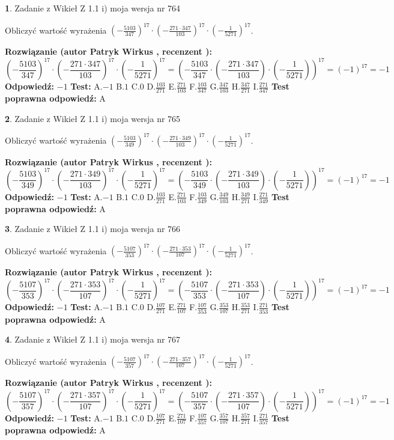 \documentclass[12pt, a4paper]{article}
\theoremstyle{definition} %
\newtheorem{zad}{}
\newcommand{\zadStart}[1]{\begin{zad}#1\newline}
\newcommand{\zadStop}{\end{zad}}
\newcommand{\rozwStart}[2]{\noindent \textbf{Rozwiązanie (autor #1 , recenzent #2): }\newline}
\newcommand{\rozwStop}{\newline}
\newcommand{\odpStart}{\noindent \textbf{Odpowiedź:}\newline}
\newcommand{\odpStop}{\newline}
\newcommand{\testStart}{\noindent \textbf{Test:}\newline}
\newcommand{\testStop}{\newline}
\newcommand{\kluczStart}{\noindent \textbf{Test poprawna odpowiedź:}\newline}
\newcommand{\kluczStop}{\newline}
\begin{document}
\zadStart{Zadanie z Wikieł Z 1.1 i) moja wersja nr 764}

Obliczyć wartość wyrażenia $(-\frac{5103}{347})^{17} \cdot (-\frac{271 \cdot 347}{103})^{17} \cdot (-\frac{1}{5271})^{17}$.
\zadStop
\rozwStart{Patryk Wirkus}{}
$$(-\frac{5103}{347})^{17} \cdot (-\frac{271 \cdot 347}{103})^{17} \cdot (-\frac{1}{5271})^{17} = (-\frac{5103}{347} \cdot (-\frac{271 \cdot 347}{103}) \cdot (-\frac{1}{5271}))^{17} = (-1)^{17} = -1$$
\rozwStop
\odpStart
$-1$
\odpStop
\testStart
A.$-1$ B.$1$ C.$0$ D.$\frac{103}{271}$ E.$\frac{271}{103}$
F.$\frac{103}{347}$ G.$\frac{347}{103}$
H.$\frac{347}{271}$
I.$\frac{271}{347}$
\testStop
\kluczStart
A
\kluczStop



\zadStart{Zadanie z Wikieł Z 1.1 i) moja wersja nr 765}

Obliczyć wartość wyrażenia $(-\frac{5103}{349})^{17} \cdot (-\frac{271 \cdot 349}{103})^{17} \cdot (-\frac{1}{5271})^{17}$.
\zadStop
\rozwStart{Patryk Wirkus}{}
$$(-\frac{5103}{349})^{17} \cdot (-\frac{271 \cdot 349}{103})^{17} \cdot (-\frac{1}{5271})^{17} = (-\frac{5103}{349} \cdot (-\frac{271 \cdot 349}{103}) \cdot (-\frac{1}{5271}))^{17} = (-1)^{17} = -1$$
\rozwStop
\odpStart
$-1$
\odpStop
\testStart
A.$-1$ B.$1$ C.$0$ D.$\frac{103}{271}$ E.$\frac{271}{103}$
F.$\frac{103}{349}$ G.$\frac{349}{103}$
H.$\frac{349}{271}$
I.$\frac{271}{349}$
\testStop
\kluczStart
A
\kluczStop



\zadStart{Zadanie z Wikieł Z 1.1 i) moja wersja nr 766}

Obliczyć wartość wyrażenia $(-\frac{5107}{353})^{17} \cdot (-\frac{271 \cdot 353}{107})^{17} \cdot (-\frac{1}{5271})^{17}$.
\zadStop
\rozwStart{Patryk Wirkus}{}
$$(-\frac{5107}{353})^{17} \cdot (-\frac{271 \cdot 353}{107})^{17} \cdot (-\frac{1}{5271})^{17} = (-\frac{5107}{353} \cdot (-\frac{271 \cdot 353}{107}) \cdot (-\frac{1}{5271}))^{17} = (-1)^{17} = -1$$
\rozwStop
\odpStart
$-1$
\odpStop
\testStart
A.$-1$ B.$1$ C.$0$ D.$\frac{107}{271}$ E.$\frac{271}{107}$
F.$\frac{107}{353}$ G.$\frac{353}{107}$
H.$\frac{353}{271}$
I.$\frac{271}{353}$
\testStop
\kluczStart
A
\kluczStop



\zadStart{Zadanie z Wikieł Z 1.1 i) moja wersja nr 767}

Obliczyć wartość wyrażenia $(-\frac{5107}{357})^{17} \cdot (-\frac{271 \cdot 357}{107})^{17} \cdot (-\frac{1}{5271})^{17}$.
\zadStop
\rozwStart{Patryk Wirkus}{}
$$(-\frac{5107}{357})^{17} \cdot (-\frac{271 \cdot 357}{107})^{17} \cdot (-\frac{1}{5271})^{17} = (-\frac{5107}{357} \cdot (-\frac{271 \cdot 357}{107}) \cdot (-\frac{1}{5271}))^{17} = (-1)^{17} = -1$$
\rozwStop
\odpStart
$-1$
\odpStop
\testStart
A.$-1$ B.$1$ C.$0$ D.$\frac{107}{271}$ E.$\frac{271}{107}$
F.$\frac{107}{357}$ G.$\frac{357}{107}$
H.$\frac{357}{271}$
I.$\frac{271}{357}$
\testStop
\kluczStart
A
\kluczStop
\end{document}
